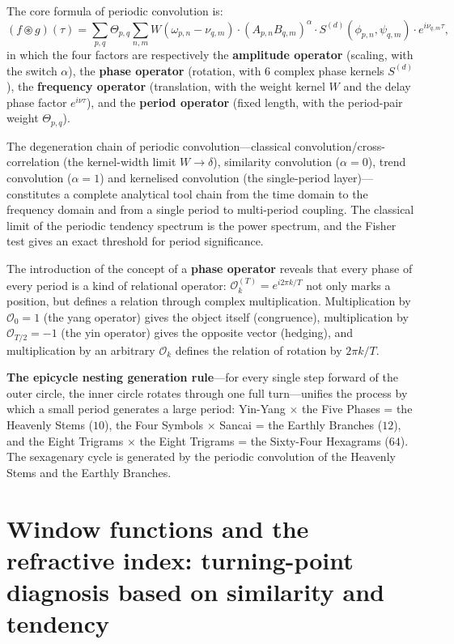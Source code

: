 The core formula of periodic convolution is:
\[
(f \circledast g)(\tau) = \sum_{p,q} \Theta_{p,q} \sum_{n,m} W(\omega_{p,n} - \nu_{q,m}) \cdot (A_{p,n} B_{q,m})^{\alpha} \cdot S^{(d)}(\phi_{p,n}, \psi_{q,m}) \cdot e^{i\nu_{q,m} \tau},
\]
in which the four factors are respectively the \textbf{amplitude operator} (scaling, with the switch $\alpha$), the \textbf{phase operator} (rotation, with 6 complex phase kernels $S^{(d)}$), the \textbf{frequency operator} (translation, with the weight kernel $W$ and the delay phase factor $e^{i\nu\tau}$), and the \textbf{period operator} (fixed length, with the period-pair weight $\Theta_{p,q}$).

The degeneration chain of periodic convolution---classical convolution/cross-correlation (the kernel-width limit $W \to \delta$), similarity convolution ($\alpha = 0$), trend convolution ($\alpha = 1$) and kernelised convolution (the single-period layer)---constitutes a complete analytical tool chain from the time domain to the frequency domain and from a single period to multi-period coupling. The classical limit of the periodic tendency spectrum is the power spectrum, and the Fisher test gives an exact threshold for period significance.

The introduction of the concept of a \textbf{phase operator} reveals that every phase of every period is a kind of relational operator: $\mathcal{O}_k^{(T)} = e^{i2\pi k/T}$ not only marks a position, but defines a relation through complex multiplication. Multiplication by $\mathcal{O}_0 = 1$ (the yang operator) gives the object itself (congruence), multiplication by $\mathcal{O}_{T/2} = -1$ (the yin operator) gives the opposite vector (hedging), and multiplication by an arbitrary $\mathcal{O}_k$ defines the relation of rotation by $2\pi k/T$.

\textbf{The epicycle nesting generation rule}---for every single step forward of the outer circle, the inner circle rotates through one full turn---unifies the process by which a small period generates a large period: Yin-Yang $\times$ the Five Phases = the Heavenly Stems ($10$), the Four Symbols $\times$ Sancai = the Earthly Branches ($12$), and the Eight Trigrams $\times$ the Eight Trigrams = the Sixty-Four Hexagrams ($64$). The sexagenary cycle is generated by the periodic convolution of the Heavenly Stems and the Earthly Branches.

\section{Window functions and the refractive index: turning-point diagnosis based on similarity and tendency}


